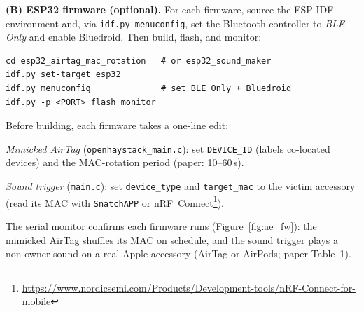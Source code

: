 \documentclass[nonacm,sigconf]{acmart}
\begin{document}
\noindent\textbf{(B) ESP32 firmware (optional).}
For each firmware, source the ESP-IDF environment and, via
\texttt{idf.py menuconfig}, set the Bluetooth controller to \emph{BLE Only} and
enable Bluedroid. Then build, flash, and monitor:
\begin{lstlisting}
cd esp32_airtag_mac_rotation   # or esp32_sound_maker
idf.py set-target esp32
idf.py menuconfig              # set BLE Only + Bluedroid
idf.py -p <PORT> flash monitor
\end{lstlisting}
Before building, each firmware takes a one-line edit:
\begin{compactitem}
  \item \emph{Mimicked AirTag} (\texttt{openhaystack\_main.c}): set
        \texttt{DEVICE\_ID} (labels co-located devices) and the MAC-rotation
        period (paper: 10--60\,s).
  \item \emph{Sound trigger} (\texttt{main.c}): set \texttt{device\_type} and
        \texttt{target\_mac} to the victim accessory (read its MAC with
        \texttt{SnatchAPP} or nRF~Connect\footnote{\url{https://www.nordicsemi.com/Products/Development-tools/nRF-Connect-for-mobile}}).
\end{compactitem}
The serial monitor confirms each firmware runs (Figure~\ref{fig:ae_fw}): the
mimicked AirTag shuffles its MAC on schedule, and the sound trigger plays a
non-owner sound on a real Apple accessory (AirTag or AirPods; paper Table~1).
\end{document}
